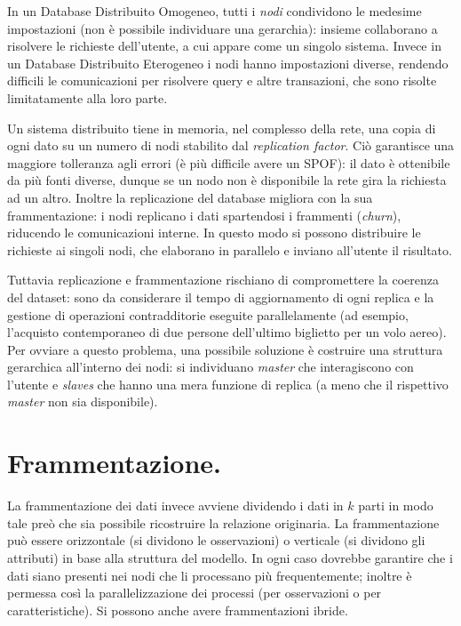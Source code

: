 \documentclass[a4page, 11pt]{article}
\begin{document}
In un Database Distribuito Omogeneo, tutti i \textit{nodi} condividono le medesime impostazioni (non è possibile individuare una gerarchia): insieme collaborano a risolvere le richieste dell'utente, a cui appare come un singolo sistema.
Invece in un Database Distribuito Eterogeneo i nodi hanno impostazioni diverse, rendendo difficili le comunicazioni per risolvere query e altre transazioni, che sono risolte limitatamente alla loro parte.

Un sistema distribuito tiene in memoria, nel complesso della rete, una copia di ogni dato su un numero di nodi stabilito dal \textit{replication factor}.
Ciò garantisce una maggiore tolleranza agli errori (è più difficile avere un SPOF): il dato è ottenibile da più fonti diverse, dunque se un nodo non è disponibile la rete gira la richiesta ad un altro.
Inoltre la replicazione del database migliora con la sua frammentazione: i nodi replicano i dati spartendosi i frammenti (\textit{churn}), riducendo le comunicazioni interne.
In questo modo si possono distribuire le richieste ai singoli nodi, che elaborano in parallelo e inviano all'utente il risultato.

Tuttavia replicazione e frammentazione rischiano di compromettere la coerenza del dataset: sono da considerare il tempo di aggiornamento di ogni replica e la gestione di operazioni contradditorie eseguite parallelamente (ad esempio, l'acquisto contemporaneo di due persone dell'ultimo biglietto per un volo aereo).
Per ovviare a questo problema, una possibile soluzione è costruire una struttura gerarchica all'interno dei nodi: si individuano \textit{master} che interagiscono con l'utente e \textit{slaves} che hanno una mera funzione di replica (a meno che il rispettivo \textit{master} non sia disponibile).

\section{Frammentazione.}
La frammentazione dei dati invece avviene dividendo i dati in $k$ parti in modo tale preò che sia possibile ricostruire la relazione originaria.
La frammentazione può essere orizzontale (si dividono le osservazioni) o verticale (si dividono gli attributi) in base alla struttura del modello.
In ogni caso dovrebbe garantire che i dati siano presenti nei nodi che li processano più frequentemente; inoltre è permessa così la parallelizzazione dei processi (per osservazioni o per caratteristiche).
Si possono anche avere frammentazioni ibride.
\end{document}
